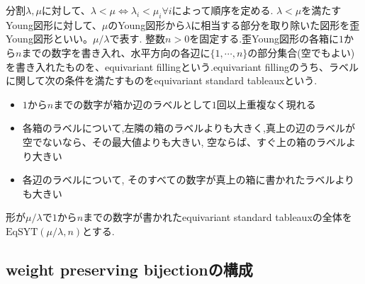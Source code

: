\begin{defin}
  分割$\lambda, \mu$に対して、$\lambda<\mu\Leftrightarrow \lambda_i<\mu_i \forall i$によって順序を定める. $\lambda<\mu$を満たすYoung図形に対して、$\mu$のYoung図形から$\lambda$に相当する部分を取り除いた図形を歪Young図形といい。$\mu/\lambda$で表す. 整数$n>0$を固定する.歪Young図形の各箱に$1$から$n$までの数字を書き入れ、水平方向の各辺に$\{1,\cdots,n\}$の部分集合(空でもよい)を書き入れたものを、equivariant fillingという.equivariant fillingのうち、ラベルに関して次の条件を満たすものをequivariant standard tableauxという.
  \begin{itemize}
    \item $1$から$n$までの数字が箱か辺のラベルとして$1$回以上重複なく現れる
    \item 各箱のラベルについて,左隣の箱のラベルよりも大きく,真上の辺のラベルが空でないなら、その最大値よりも大きい, 空ならば、すぐ上の箱のラベルより大きい
    \item 各辺のラベルについて, そのすべての数字が真上の箱に書かれたラベルよりも大きい
  \end{itemize}
  形が$\mu/\lambda$で$1$から$n$までの数字が書かれたequivariant standard tableauxの全体を$\text{EqSYT}(\mu/\lambda, n)$とする.
\end{defin}








\subsection{weight preserving bijectionの構成}